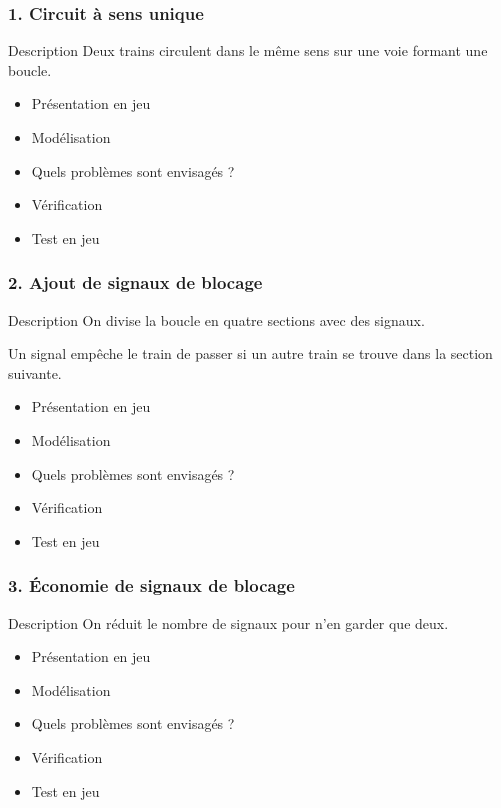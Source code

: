 \documentclass[french]{beamer}
\begin{document}
\begin{frame}
  \frametitle{1. Circuit à sens unique}
  \begin{block}{Description}
  Deux trains circulent dans le même sens sur une voie formant une boucle.
  \end{block}

  \begin{itemize}
  \item Présentation en jeu
  \item Modélisation
  \item Quels problèmes sont envisagés ?
  \item Vérification
  \item Test en jeu
  \end{itemize}
\end{frame}

\begin{frame}
  \frametitle{2. Ajout de signaux de blocage}
  \begin{block}{Description}
  On divise la boucle en quatre sections avec des signaux.

  Un signal empêche le train de passer si un autre train se trouve dans la section suivante.
  \end{block}

  \begin{itemize}
  \item Présentation en jeu
  \item Modélisation
  \item Quels problèmes sont envisagés ?
  \item Vérification
  \item Test en jeu
  \end{itemize}
\end{frame}

\begin{frame}
  \frametitle{3. Économie de signaux de blocage}
  \begin{block}{Description}
  On réduit le nombre de signaux pour n'en garder que deux.
  \end{block}

  \begin{itemize}
  \item Présentation en jeu
  \item Modélisation
  \item Quels problèmes sont envisagés ?
  \item Vérification
  \item Test en jeu
  \end{itemize}
\end{frame}
\end{document}
